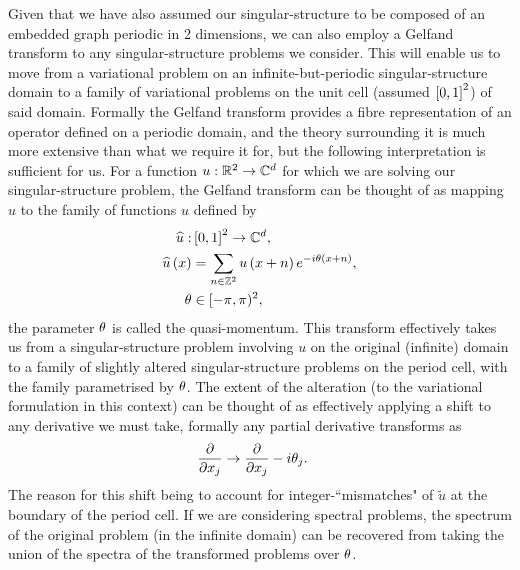 Given that we have also assumed our singular-structure to be composed of an embedded graph periodic in 2 dimensions, we can also employ a Gelfand transform to any singular-structure problems we consider.
This will enable us to move from a variational problem on an infinite-but-periodic singular-structure domain to a family of variational problems on the unit cell (assumed $\left[ 0,1 \right]^2$) of said domain.
Formally the Gelfand transform provides a fibre representation of an operator defined on a periodic domain, and the theory surrounding it is much more extensive than what we require it for, but the following interpretation is sufficient for us.
For a function $u:\mathbb{R}^{2}\rightarrow\mathbb{C}^{d}$ for which we are solving our singular-structure problem, the Gelfand transform can be thought of as mapping $u$ to the family of functions $\widehat{u}$ defined by
\begin{align*}
	\widehat{u}: &\left[ 0,1 \right]^{2} \rightarrow \mathbb{C}^{d}, \\
	\widehat{u}\left( x \right) &= \sum_{n\in\mathbb{Z}^{2}} u\left( x + n \right)e^{-i\theta\left( x + n \right)}, \\
	\theta &\in [-\pi,\pi)^{2},
\end{align*}
the parameter $\theta$ is called the quasi-momentum.
This transform effectively takes us from a singular-structure problem involving $u$ on the original (infinite) domain to a family of slightly altered singular-structure problems on the period cell, with the family parametrised by $\theta$.
The extent of the alteration (to the variational formulation in this context) can be thought of as effectively applying a shift to any derivative we must take, formally any partial derivative transforms as
\begin{align*}
	\dfrac{\partial }{\partial x_j} &\rightarrow \dfrac{\partial }{\partial x_j} - i\theta_j.
\end{align*}
The reason for this shift being to account for integer-``mismatches" of $\widetilde{u}$ at the boundary of the period cell.
If we are considering spectral problems, the spectrum of the original problem (in the infinite domain) can be recovered from taking the union of the spectra of the transformed problems over $\theta$. \newline

